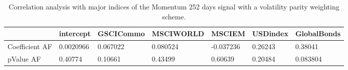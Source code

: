 \begin{table}[H]
\centering
\begin{tabular}{lllllll}
\hline& intercept & GSCICommo & MSCIWORLD & MSCIEM & USDindex & GlobalBonds \\ 
\hline 
Coefficient AF & 0.0020966 & 0.067022 & 0.080524 & -0.037236 & 0.26243 & 0.38041 \\ 
pValue AF & 0.40774 & 0.10661 & 0.43499 & 0.60639 & 0.20484 & 0.083804 \\ 
\hline
\end{tabular}
\caption{Correlation analysis with major indices of the Momentum 252 days signal with a volatility parity weighting scheme.}
\label{MOM252VP_AFACTOR}
\end{table}